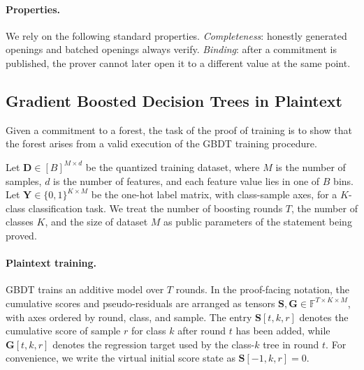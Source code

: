\paragraph{Properties.}
We rely on the following standard properties. \emph{Completeness}: honestly generated openings
and batched openings always verify.  \emph{Binding}: after a
commitment is published, the prover cannot later open it to a different value at
the same point. 

\subsection{Gradient Boosted Decision Trees in Plaintext}\label{subsec:prelim-gbdt}

Given a commitment to a forest, the task of the proof of training is to show that
the forest arises from a valid execution of the GBDT training procedure.

Let $\mathbf{D}\in[B]^{M\times d}$ be the quantized training dataset, where
$M$ is the number of samples, $d$ is the number of features, and each feature
value lies in one of $B$ bins. Let $\mathbf{Y}\in\{0,1\}^{K\times M}$ be the
one-hot label matrix, with class-sample axes, for a $K$-class classification task. We treat the number
of boosting rounds $T$,
the number of classes $K$,
and the size of dataset $M$
as public parameters of the statement being proved.

\paragraph{Plaintext training.}
GBDT trains an additive model over $T$ rounds. In the proof-facing notation,
the cumulative scores and pseudo-residuals are arranged as tensors
$\mathbf{S},\mathbf{G}\in\mathbb{F}^{T\times K\times M}$, with axes ordered by
round, class, and sample. The entry $\mathbf{S}[t,k,r]$ denotes the cumulative
score of sample $r$ for class $k$ after round $t$ has been added, while
$\mathbf{G}[t,k,r]$ denotes the regression target used by the class-$k$ tree in
round $t$. For convenience, we write the virtual initial score state as
$\mathbf{S}[-1,k,r]=0$.


